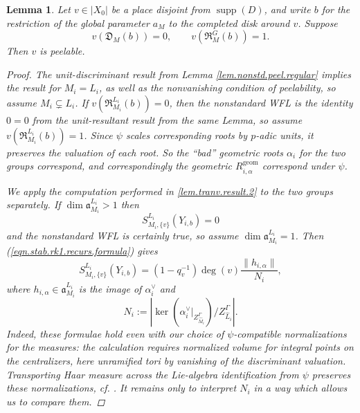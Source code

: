 \documentclass[openany]{amsbook}
\newtheorem{lemma}[theorem]{Lemma}
\theoremstyle{definition}
\theoremstyle{remark}
\numberwithin{equation}{section}
\renewcommand{\-}{\operatorname{-}}
\renewcommand{\a}{\mathfrak{a}}
\newcommand{\on}[1]{\operatorname{#1}}
\newcommand{\fD}{\mathfrak{D}}
\newcommand{\fR}{\mathfrak{R}}
\begin{document}
\begin{lemma}\label{lem.nonstd.transv.result}
    Let $v \in |X_0|$ be a place disjoint from $\on{supp}(D)$, and write $b$ for the restriction of the global parameter $a_M$ to the completed disk around $v$. Suppose
    \begin{equation}
        v(\fD_{M}(b)) = 0, \qquad v(\fR_{M}^G(b)) = 1.\label{eqn.nonstd.transv.result}
    \end{equation}
    Then $v$ is peelable.
    \begin{proof}
        The unit-discriminant result from Lemma \ref{lem.nonstd.peel.regular} implies the result for $M_i = L_i$, as well as the nonvanishing condition of peelability, so assume $M_i \subsetneq L_i$. If $v(\fR_{M_i}^{L_i}(b)) = 0$, then the nonstandard WFL is the identity $0 = 0$ from the unit-resultant result from the same Lemma, so assume $v(\fR_{M_i}^{L_i}(b)) = 1$. Since $\psi$ scales corresponding roots by $p$-adic units, it preserves the valuation of each root. So the ``bad'' geometric roots $\alpha_i$ for the two groups correspond, and correspondingly the geometric $R_{i,\alpha}^{\on{geom}}$ correspond under $\psi$. 

        We apply the computation performed in \ref{lem.tranv.result.2} to the two groups separately. If $\dim \a_{M_i}^{L_i} > 1$ then
        $$
            S_{M_i,\{v\}}^{L_i}(Y_{i,b}) = 0
        $$
        and the nonstandard WFL is certainly true, so assume $\dim \a_{M_i}^{L_i} = 1$. Then (\ref{eqn.stab.rk1.recurs.formula}) gives
        $$
            S_{M_i, \{v\}}^{L_i}(Y_{i,b}) = (1 - q_v^{-1}) \deg(v) \frac{\|h_{i, \alpha}\|}{N_i}, 
        $$
        where $h_{i,\alpha} \in \a_{M_i}^{L_i}$ is the image of $\alpha_i^\vee$ and 
        $$
            N_i := \left|\ker\left( \alpha_i^\vee |_{Z_{\widehat{M}_i}^\Gamma}\right) / Z_{\widehat{L}_i}^\Gamma \right|.
        $$
        Indeed, these formulae hold even with our choice of $\psi$-compatible normalizations for the measures: the calculation requires normalized volume for integral points on the centralizers, here unramified tori by vanishing of the discriminant valuation. Transporting Haar measure across the Lie-algebra identification from $\psi$ preserves these normalizations, cf. \cite[\S 1.12]{ngofl}. It remains only to interpret $N_i$ in a way which allows us to compare them. 


\end{proof}
\end{lemma}
\end{document}
